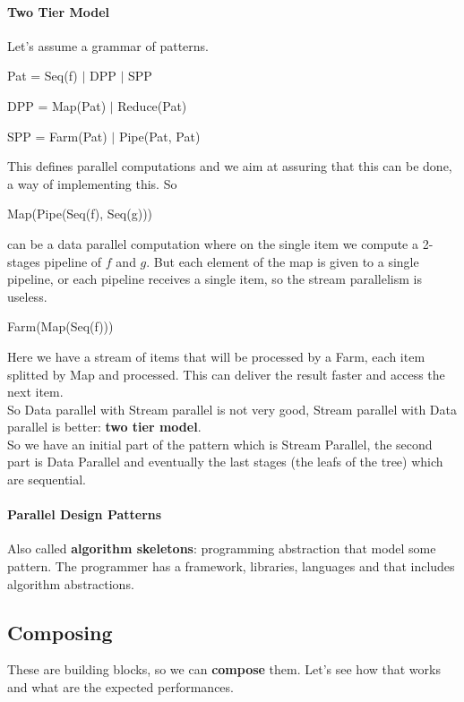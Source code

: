 \documentclass[10pt]{report}
\begin{document}
\paragraph{Two Tier Model} Let's assume a grammar of patterns.\begin{list}{}{}
	\item Pat = Seq(f) $|$ DPP $|$ SPP
	\item DPP = Map(Pat) $|$ Reduce(Pat)
	\item SPP = Farm(Pat) $|$ Pipe(Pat, Pat)
\end{list}
This defines parallel computations and we aim at assuring that this can be done, a way of implementing this. So\begin{list}{}{}
	\item Map(Pipe(Seq(f), Seq(g)))
\end{list}
can be a data parallel computation where on the single item we compute a 2-stages pipeline of $f$ and $g$. But each element of the map is given to a single pipeline, or each pipeline receives a single item, so the stream parallelism is useless.
\begin{list}{}{}
	\item Farm(Map(Seq(f)))
\end{list}
Here we have a stream of items that will be processed by a Farm, each item splitted by Map and processed. This can deliver the result faster and access the next item.\\
So Data parallel with Stream parallel is not very good, Stream parallel with Data parallel is better: \textbf{two tier model}.\\
So we have an initial part of the pattern which is Stream Parallel, the second part is Data Parallel and eventually the last stages (the leafs of the tree) which are sequential.
\paragraph{Parallel Design Patterns}
Also called \textbf{algorithm skeletons}: programming abstraction that model some pattern. The programmer has a framework, libraries, languages and that includes algorithm abstractions.
\subsection{Composing}
These are building blocks, so we can \textbf{compose} them. Let's see how that works and what are the expected performances.
\end{document}
